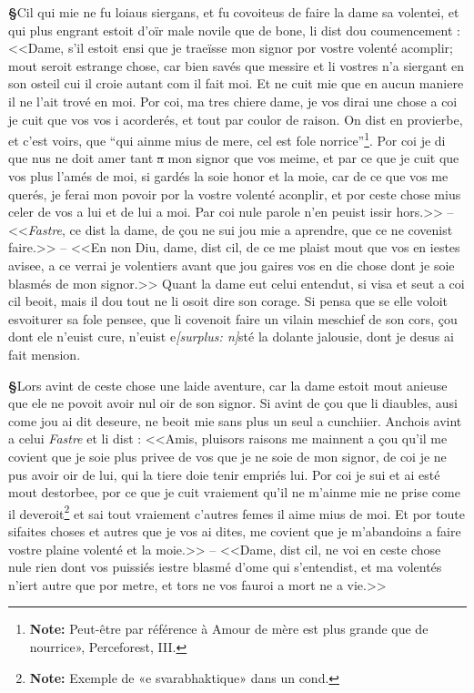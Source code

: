 \documentclass[12pt]{article} %
\newcommand{\persName}[1]{\emph{#1}} %
\newcommand{\supplied}[1]{\textlangle#1\textrangle} %
\newcommand{\fnnote}[1]{\footnote{\textbf{Note:} #1}} %
\newcommand{\del}[1]{\sout{#1}}      %
\newcommand{\surplus}[1]{\textit{[surplus: #1]}} %
\newcounter{paranum}
\newcommand{\pnum}{\stepcounter{paranum}\textbf{§\arabic{paranum}}\quad}
\begin{document}
\pnum Cil qui mie ne fu loiaus siergans, et fu covoiteus de faire la dame sa volentei, et qui plus engrant estoit d'oïr male novile que de bone, li dist dou coumenceme\supplied{n}t : <<Dame, s'il estoit ensi que je traeïsse mon signor por vostre volenté acomplir; mout seroit estrange chose, car bien savés que messire et li vostres n'a siergant en son osteil cui il croie autant com il fait moi. Et ne cuit mie que en aucun maniere il ne l'ait trové en moi. Por coi, ma tres chiere dame, je vos dirai une chose a coi je cuit que vos vos i acorderés, et tout par coulor de raison. On dist en provierbe, et c'est voirs, que ``qui ainme mius de mere, cel est fole norrice''\fnnote{Peut-être par référence à Amour de mère est plus grande que de nourrice», Perceforest, III.}. Por coi je di que nus ne doit amer tant \del{a} mon signor que vos meime, et par ce que je cuit que vos plus l'amés de moi, si gardés la soie honor et la moie, car de ce que vos me querés, je ferai mon povoir por la vostre volenté aconplir, et por ceste chose mius celer de vos a lui et de lui a moi. Par coi nule parole n'en peuist issir hors.>> -- <<\persName{Fastre}, ce dist la dame, de çou ne sui jou mie a aprendre, que ce ne covenist faire.>> -- <<En non Diu, dame, dist cil, de ce me plaist mout que vos en iestes avisee, a ce verrai je volentiers avant que jou gaires vos en die chose dont je soie blasmés de mon signor.>> Quant la dame eut celui entendut, si visa et seut a coi cil beoit, mais il dou tout ne li osoit dire son corage. Si pensa que se elle voloit esvoiturer sa fole pensee, que li covenoit faire un vilain meschief de son cors, çou dont ele n'euist cure, n'euist e\surplus{n}sté la dolante jalousie, dont je desus ai fait mension.


\pnum Lors avint de ceste chose une laide aventure, car la dame estoit mout anieuse que ele ne povoit avoir nul oir de son signor. Si avint de çou que li diaubles, ausi come jou ai dit deseure, ne beoit mie sans plus un seul a cu\supplied{n}chiier. Anchois avint a celui \persName{Fastre} et li dist : <<Amis, pluisors raisons me mainnent a çou qu'il me covient que je soie plus privee de vos que je ne soie de mon signor, de coi je ne pus avoir oir de lui, qui la tiere doie tenir empriés lui. Por coi je sui et ai esté mout destorbee, por ce que je cuit vraiement qu'il ne m'ainme mie ne prise come il deveroit\fnnote{Exemple de «e svarabhaktique» dans un cond.} et sai tout vraiement c'autres femes il aime mius de moi. Et por toute sifaites choses et autres que je vos ai dites, me covient que je m'abandoins a faire vostre plaine volenté et la moie.>> -- <<Dame, dist cil, ne voi en ceste chose nule rien dont vos puissiés iestre blasmé d'ome qui s'entendist, et ma vole\supplied{n}tés n'iert autre que por metre, et tors ne vos fauroi a mort ne a vie.>>
\end{document}
